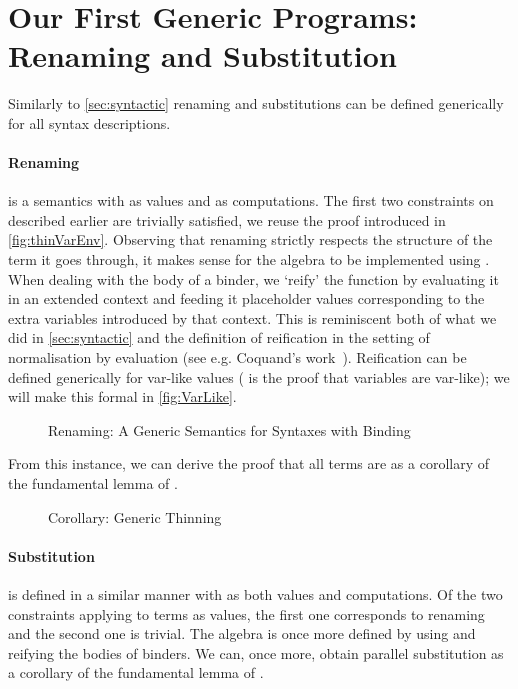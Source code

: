 \section{Our First Generic Programs: Renaming and Substitution}
\label{section:renandsub}

Similarly to \cref{sec:syntactic} renaming and substitutions can
be defined generically for all syntax descriptions.

\paragraph{Renaming} is a semantics with  as values and 
as computations. The first two constraints on  described earlier
are trivially satisfied, we reuse the proof 
introduced in \cref{fig:thinVarEnv}.
%
Observing that renaming strictly respects the structure of the term it goes
through, it makes sense for the algebra to be implemented using .
When dealing with the body of a binder, we `reify' the  function
by evaluating it in an extended context and feeding it placeholder values
corresponding to the extra variables introduced by that context. This is
reminiscent both of what we did in \cref{sec:syntactic} and the definition
of reification in the setting of normalisation by evaluation (see e.g.
Coquand's work~\citeyear{coquand2002formalised}). Reification can be defined
generically for var-like values ( is the proof that
variables are var-like); we will make this formal in \cref{fig:VarLike}.

\begin{figure}[h]
\caption{Renaming: A Generic Semantics for Syntaxes with Binding\label{fig:genrensem}}
\end{figure}

From this instance, we can derive the proof that all terms are  as
a corollary of the fundamental lemma of .

\begin{figure}[h]
\caption{Corollary: Generic Thinning\label{fig:genren}}
\end{figure}

\paragraph{Substitution} is defined in a similar manner with 
as both values and computations. Of the two constraints applying to
terms as values, the first one corresponds to renaming and the second
one is trivial. The algebra is once more defined by using  and
reifying the bodies of binders. We can, once more, obtain parallel
substitution as a corollary of the fundamental lemma of .


